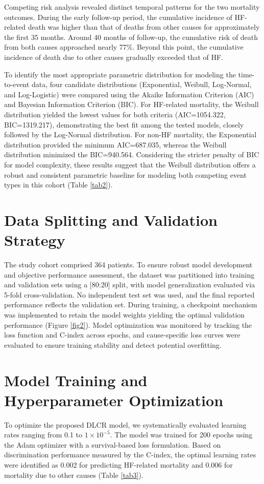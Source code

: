 \documentclass[twoside]{article}
\begin{document}
Competing risk analysis revealed distinct temporal patterns for the two mortality outcomes. During the early follow-up period, the cumulative incidence of HF-related death was higher than that of deaths from other causes for approximately the first 35 months. Around 40 months of follow-up, the cumulative risk of death from both causes approached nearly 77\%. Beyond this point, the cumulative incidence of death due to other causes gradually exceeded that of HF.

To identify the most appropriate parametric distribution for modeling the time-to-event data, four candidate distributions (Exponential, Weibull, Log-Normal, and Log-Logistic) were compared using the Akaike Information Criterion (AIC) and Bayesian Information Criterion (BIC). 
For HF-related mortality, the Weibull distribution yielded the lowest values for both criteria (AIC=1054.322, BIC=1319.217), demonstrating the best fit among the tested models, closely followed by the Log-Normal distribution. 
For non-HF mortality, the Exponential distribution provided the minimum AIC=687.035, whereas the Weibull distribution minimized the BIC=940.564. Considering the stricter penalty of BIC for model complexity, these results suggest that the Weibull distribution offers a robust and consistent parametric baseline for modeling both competing event types in this cohort (Table \ref{tab2}). 
\section{Data Splitting and Validation Strategy }
The study cohort comprised 364 patients. To ensure robust model development and objective performance assessment, the dataset was partitioned into training and validation sets using a [80:20] split, with model generalization evaluated via 5-fold cross-validation. No independent test set was used, and the final reported performance reflects the validation set. During training, a checkpoint mechanism was implemented to retain the model weights yielding the optimal validation performance (Figure \ref{fig2}). Model optimization was monitored by tracking the loss function and C-index across epochs, and cause-specific loss curves were evaluated to ensure training stability and detect potential overfitting. 

\section{Model Training and Hyperparameter Optimization}
To optimize the proposed DLCR model, we systematically evaluated learning rates ranging from 0.1 to $1\times10^{-5}$. The model was trained for 200 epochs using the Adam optimizer with a survival-based loss formulation. Based on discrimination performance measured by the C-index, the optimal learning rates were identified as 0.002 for predicting HF-related mortality and 0.006 for mortality due to other causes (Table \ref{tab3}). 
\end{document}
